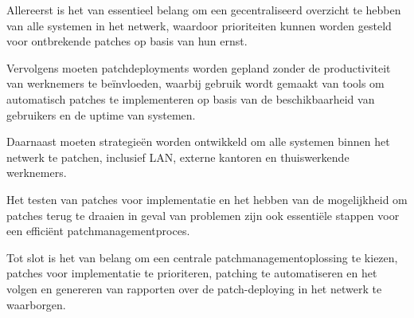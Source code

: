 Allereerst is het van essentieel belang om een gecentraliseerd overzicht te hebben van alle systemen in het netwerk, waardoor prioriteiten kunnen worden gesteld voor ontbrekende patches op basis van hun ernst.

 Vervolgens moeten patchdeployments worden gepland zonder de productiviteit van werknemers te beïnvloeden, waarbij gebruik wordt gemaakt van tools om automatisch patches te implementeren op basis van de beschikbaarheid van gebruikers en de uptime van systemen.

 Daarnaast moeten strategieën worden ontwikkeld om alle systemen binnen het netwerk te patchen, inclusief LAN, externe kantoren en thuiswerkende werknemers.

 Het testen van patches voor implementatie en het hebben van de mogelijkheid om patches terug te draaien in geval van problemen zijn ook essentiële stappen voor een efficiënt patchmanagementproces.

 Tot slot is het van belang om een centrale patchmanagementoplossing te kiezen, patches voor implementatie te prioriteren, patching te automatiseren en het volgen en genereren van rapporten over de patch-deploying in het netwerk te waarborgen.

 \autocite{ManageEngine2024}
